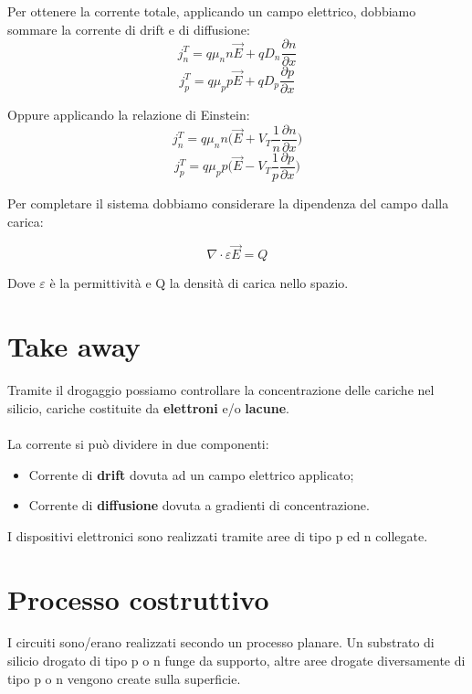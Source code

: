 Per ottenere la corrente totale, applicando un campo elettrico, dobbiamo sommare la corrente di drift e di diffusione:
\begin{equation}
    j_n^T = q\mu_nn\vec{E} + qD_n\frac{\partial n}{\partial x}
\end{equation}
\begin{equation}
    j_p^T = q\mu_pp\vec{E} + qD_p\frac{\partial p}{\partial x}
\end{equation}

Oppure applicando la relazione di Einstein: 
\begin{equation}
    j_n^T = q\mu_nn\biggl(\vec{E} + V_T\frac{1}{n}\frac{\partial n}{\partial x}\biggl)
\end{equation}
\begin{equation}
    j_p^T = q\mu_pp\biggl(\vec{E} - V_T\frac{1}{p}\frac{\partial p}{\partial x}\biggl)
    \label{eq_eine}
\end{equation}

Per completare il sistema dobbiamo considerare	la	dipendenza	del	campo	dalla	carica:

\begin{equation*}
    \nabla \cdot \varepsilon \vec{E} = Q
\end{equation*}

Dove $\varepsilon$ è la permittività e Q la	densità	di	carica	nello	spazio.

\newpage
\section{Take away}
Tramite	il	drogaggio	possiamo	controllare	la	
concentrazione	delle	cariche	nel	silicio, cariche	costituite	da	\textbf{elettroni}	e/o	\textbf{lacune}.
\paragraph{}
La corrente si può dividere in due componenti:
\begin{itemize}
    \item Corrente	di	\textbf{drift} dovuta	ad	un	campo	elettrico	applicato;
    \item Corrente	di	\textbf{diffusione} dovuta	a	gradienti	di	concentrazione.
\end{itemize}

I	dispositivi	elettronici	sono	realizzati	tramite	aree	di	tipo	
p	ed	n	collegate.

\section{Processo costruttivo}
I	circuiti	sono/erano	realizzati	secondo	un	processo	planare. Un	substrato	di	silicio	drogato	di	tipo	p	o	n	funge	da	supporto, altre aree	drogate	diversamente	di	tipo	p	o	n	vengono	create	sulla	superficie.

